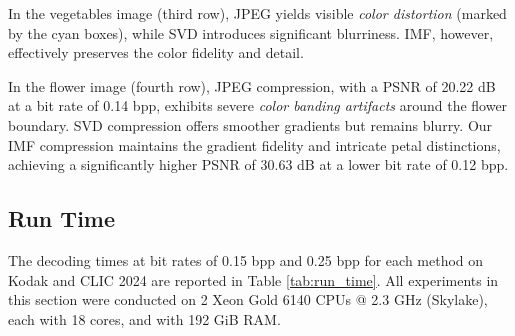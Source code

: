 In the vegetables image (third row), JPEG yields visible \emph{color distortion} (marked by the cyan boxes), while SVD introduces significant blurriness. IMF, however, effectively preserves the color fidelity and detail.

In the flower image (fourth row), JPEG compression, with a PSNR of 20.22 dB at a bit rate of 0.14 bpp, exhibits severe \emph{color banding artifacts} around the flower boundary. SVD compression offers smoother gradients but remains blurry. Our IMF compression maintains the gradient fidelity and intricate petal distinctions, achieving a significantly higher PSNR of 30.63 dB at a lower bit rate of 0.12 bpp.


\subsection{Run Time} \label{sec:run_time}

The decoding times at bit rates of 0.15 bpp and 0.25 bpp for each method on Kodak and CLIC 2024 are reported in Table \ref{tab:run_time}. All experiments in this section were conducted on 2 Xeon Gold 6140 CPUs @ 2.3 GHz (Skylake), each with 18 cores, and with 192 GiB RAM.

\begin{table}[!t]
    \caption{Mean decoding CPU times for different compression methods at bit rates of 0.15 bpp and 0.25 bpp, measured on the Kodak and CLIC 2024 datasets.}
    \label{tab:run_time}
    \centering
    \def\arraystretch{1.2}
\end{table}


